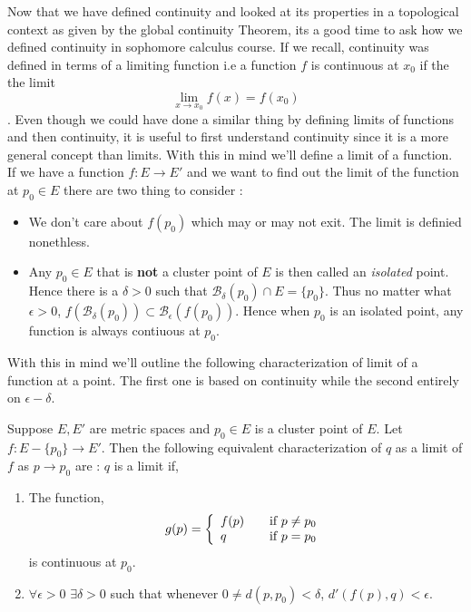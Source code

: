Now that we have defined continuity and looked at its properties in a topological context as given
by the global continuity Theorem, its a good time to ask how we defined continuity in sophomore
calculus course. If we recall, continuity was defined in terms of a limiting function i.e a function
$f$ is continuous at $x_0$ if the the limit \[ \lim_{x \to x_0} f(x) = f(x_0)\]. Even though we
could have done a similar thing by defining limits of functions and then continuity, it is useful to
first understand continuity since it is a more general concept than limits. With this in mind we'll
define a limit of a function. If we have a function $f : E \to E'$ and we want to find out the limit
of the function at $p_0 \in E$ there are two thing to consider :
\begin{itemize}
    \item We don't care about $f(p_0)$ which may or may not exit. The limit is definied nonethless. 
    \item Any $p_0 \in E$ that is \textbf{not} a cluster point of $E$ is then called an \emph{isolated}
	point. Hence there is a $\delta > 0$ such that $\mathcal{B}_{\delta}(p_0) \cap E = \lbrace
	p_0 \rbrace$. Thus no matter what $\epsilon > 0$, $f(\mathcal{B}_{\delta}(p_0)) \subset
	\mathcal{B}_{\epsilon}(f(p_0))$. Hence when $p_0$ is an isolated point, any function is always
	contiuous at $p_0$. 
\end{itemize}
With this in mind we'll outline the following characterization of limit of a function at a point.
The first one is based on continuity while the second entirely on $\epsilon-\delta$.
\begin{Definition}
    Suppose $E,E'$ are metric spaces and $p_0 \in E$ is a cluster point of $E$. Let $f : E
    - \lbrace p_0 \rbrace \to E'$. Then the following equivalent characterization of  $q$ as a limit 
    of $f$ as $p \to p_0$ are : $q$ is a limit if,
    \begin{enumerate}
	\item The function, \[ g(p) = \left\{ 
		\begin{array}{l l}
		    f(p) & \quad \text{if $p \neq p_0$ }\\
		    q & \quad \text{if $p = p_0$ }
	    \end{array} \right.\] is continuous at $p_0$.
	\item $\forall \epsilon > 0$ $\exists \delta > 0$ such that whenever 
	    $ 0 \neq d(p,p_0) < \delta$, $d'(f(p),q) < \epsilon$.

    \end{enumerate}
\end{Definition}
